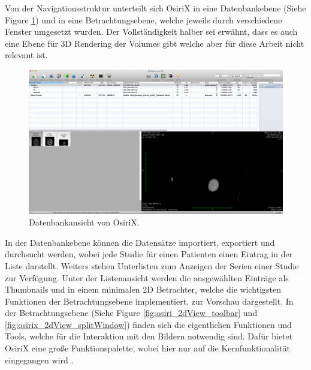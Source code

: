 Von der Navigationsstruktur unterteilt sich OsiriX in eine Datenbankebene (Siehe Figure \ref{fig:osirix_db_view}) und in eine Betrachtungsebene, 
welche jeweils durch verschiedene Fenster umgesetzt wurden.
Der Vollständigkeit halber sei erwähnt, dass es auch eine Ebene für 3D Rendering der Volumes gibt welche aber für diese Arbeit nicht relevant ist.
\begin{figure}[t]
	\centering
	\includegraphics[width=0.8\linewidth]{img/c2_osirix_db_view.jpg}
	\caption{Datenbankansicht von OsiriX.}
	\label{fig:osirix_db_view}
\end{figure}
In der Datenbankebene können die Datensätze importiert, exportiert und durchsucht werden, wobei jede Studie für einen Patienten einen Eintrag in der Liste darstellt.
Weiters stehen Unterlisten zum Anzeigen der Serien einer Studie zur Verfügung.
Unter der Listenansicht werden die ausgewählten Einträge als Thumbnails und in einem minimalen 2D Betrachter,
welche die wichtigsten Funktionen der Betrachtungsebene implementiert, zur Vorschau dargestellt.
In der Betrachtungsebene (Siehe Figure \ref{fig:osiri_2dView_toolbar} und \ref{fig:osirix_2dView_splitWindow}) finden sich die eigentlichen Funktionen und Tools, 
welche für die Interaktion mit den Bildern notwendig sind.
Dafür bietet OsiriX eine große Funktionspalette, wobei hier nur auf die Kernfunktionalität eingegangen wird \cite{osirix}.
